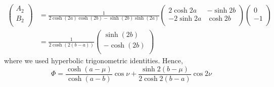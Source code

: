 \documentclass[a4paper]{article}
\begin{document}
\begin{ans}
\begin{enumerate}[label=(\alph*)]
\begin{align}
\begin{pmatrix}A_2\\B_2\\\end{pmatrix}&=\frac{1}{2\cosh(2a)\cosh(2b)-\sinh(2b)\sinh(2a)}\begin{pmatrix}2\cosh 2a&-\sinh 2b\\-2\sinh 2a&\cosh 2b\\\end{pmatrix}\begin{pmatrix}0\\-1\\\end{pmatrix}\nonumber\\&=\frac{1}{2\cosh(2(b-a))}\begin{pmatrix}\sinh(2b)\\-\cosh(2b)\\\end{pmatrix}\nonumber
\end{align}
where we used hyperbolic trigonometric identities. Hence,
$$\Phi=\frac{\cosh(a-\mu)}{\cosh(a-b)}\cos\nu+\frac{\sinh2(b-\mu)}{2\cosh2(b-a)}\cos 2\nu$$
\end{enumerate}
\end{ans}
\end{document}
